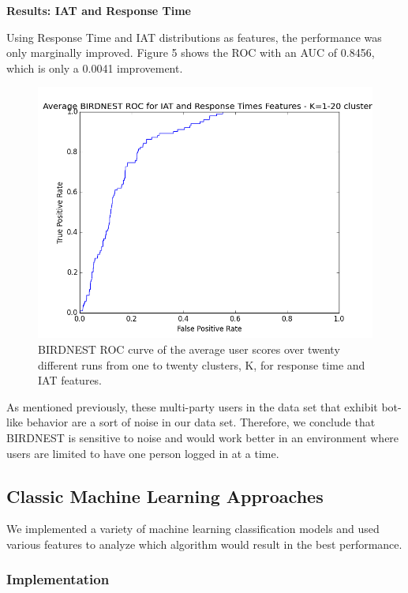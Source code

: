 \documentclass{article} %
\begin{document}
\textbf{Results: IAT and Response Time}

Using Response Time and IAT distributions as features, the performance was only marginally improved.
Figure 5 shows the ROC with an AUC of 0.8456, which is only a 0.0041 improvement.

\begin{figure}[!htb]
\centering
{\caption{BIRDNEST ROC curve of the average user scores over twenty different runs from one to twenty clusters, K, for response time and IAT features.} \includegraphics[scale=0.47]{img/bird_roc.png}}
\end{figure}

As mentioned previously, these multi-party users in the data set that exhibit bot-like behavior are a sort of noise in our data set. Therefore, we conclude that BIRDNEST is sensitive to noise and would work better in an environment where users are limited to have one person logged in at a time.

\subsection{Classic Machine Learning Approaches}

We implemented a variety of machine learning classification models and used various features to analyze which algorithm would result in the best performance.

\subsubsection{Implementation}
\end{document}
